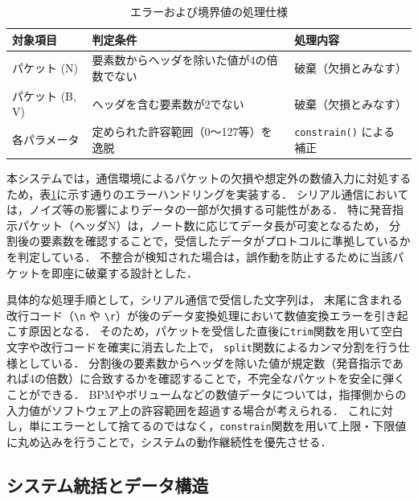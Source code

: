 \documentclass[lualatex,book,paper=a4paper,jafontsize=11.5pt,jafontscale=1.05]{jlreq}
\begin{document}
\begin{table}[H]
    \centering
    \caption{エラーおよび境界値の処理仕様}
    \label{tab:error_handling}
    \begin{tabularx}{\textwidth}{lXl}
        \hline
        \textbf{対象項目} & \textbf{判定条件} & \textbf{処理内容} \\ \hline
        パケット (N) & 要素数からヘッダを除いた値が4の倍数でない & 破棄（欠損とみなす） \\ \hline
        パケット (B, V) & ヘッダを含む要素数が2でない & 破棄（欠損とみなす） \\ \hline
        各パラメータ & 定められた許容範囲（0～127等）を逸脱 & \texttt{constrain()} による補正 \\ \hline
    \end{tabularx}
\end{table}

本システムでは，通信環境によるパケットの欠損や想定外の数値入力に対処するため，表\ref{tab:error_handling}に示す通りのエラーハンドリングを実装する．
シリアル通信においては，ノイズ等の影響によりデータの一部が欠損する可能性がある．
特に発音指示パケット（ヘッダN）は，ノート数に応じてデータ長が可変となるため，
分割後の要素数を確認することで，受信したデータがプロトコルに準拠しているかを判定している．
不整合が検知された場合は，誤作動を防止するために当該パケットを即座に破棄する設計とした．

具体的な処理手順として，シリアル通信で受信した文字列は，
末尾に含まれる改行コード（\texttt{\textbackslash n} や \texttt{\textbackslash r}）が後のデータ変換処理において数値変換エラーを引き起こす原因となる．
そのため，パケットを受信した直後に\texttt{trim}関数を用いて空白文字や改行コードを確実に消去した上で，
\texttt{split}関数によるカンマ分割を行う仕様としている．
分割後の要素数からヘッダを除いた値が規定数（発音指示であれば4の倍数）に合致するかを確認することで，不完全なパケットを安全に弾くことができる．
BPMやボリュームなどの数値データについては，指揮側からの入力値がソフトウェア上の許容範囲を超過する場合が考えられる．
これに対し，単にエラーとして捨てるのではなく，\texttt{constrain}関数を用いて上限・下限値に丸め込みを行うことで，システムの動作継続性を優先させる．



\subsection{システム統括とデータ構造}
\end{document}
